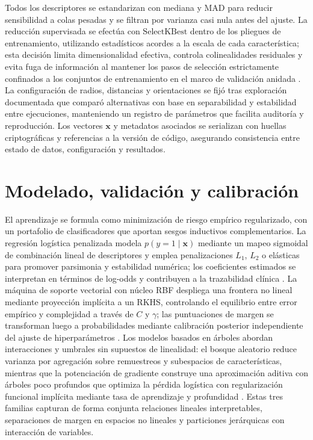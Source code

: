 Todos los descriptores se estandarizan con mediana y MAD para reducir sensibilidad a colas pesadas y se filtran por varianza casi nula antes del ajuste. La reducción supervisada se efectúa con \(\mathrm{SelectKBest}\) dentro de los pliegues de entrenamiento, utilizando estadísticos acordes a la escala de cada característica; esta decisión limita dimensionalidad efectiva, controla colinealidades residuales y evita fuga de información al mantener los pasos de selección estrictamente confinados a los conjuntos de entrenamiento en el marco de validación anidada \cite{Tsamardinos2022,Vabalas2019}. La configuración de radios, distancias y orientaciones se fijó tras exploración documentada que comparó alternativas con base en separabilidad y estabilidad entre ejecuciones, manteniendo un registro de parámetros que facilita auditoría y reproducción. Los vectores \(\mathbf{x}\) y metadatos asociados se serializan con huellas criptográficas y referencias a la versión de código, asegurando consistencia entre estado de datos, configuración y resultados.

\section{Modelado, validación y calibración}
El aprendizaje se formula como minimización de riesgo empírico regularizado, con un portafolio de clasificadores que aportan sesgos inductivos complementarios. La regresión logística penalizada modela \(p(y=1\mid\mathbf{x})\) mediante un mapeo sigmoidal de combinación lineal de descriptores y emplea penalizaciones \(L_{1}\), \(L_{2}\) o elásticas para promover parsimonia y estabilidad numérica; los coeficientes estimados se interpretan en términos de log-odds y contribuyen a la trazabilidad clínica \cite{Pedregosa2011}. La máquina de soporte vectorial con núcleo RBF despliega una frontera no lineal mediante proyección implícita a un RKHS, controlando el equilibrio entre error empírico y complejidad a través de \(C\) y \(\gamma\); las puntuaciones de margen se transforman luego a probabilidades mediante calibración posterior independiente del ajuste de hiperparámetros \cite{Pedregosa2011}. Los modelos basados en árboles abordan interacciones y umbrales sin supuestos de linealidad: el bosque aleatorio reduce varianza por agregación sobre remuestreos y subespacios de características, mientras que la potenciación de gradiente construye una aproximación aditiva con árboles poco profundos que optimiza la pérdida logística con regularización funcional implícita mediante tasa de aprendizaje y profundidad \cite{Friedman2001}. Estas tres familias capturan de forma conjunta relaciones lineales interpretables, separaciones de margen en espacios no lineales y particiones jerárquicas con interacción de variables.

